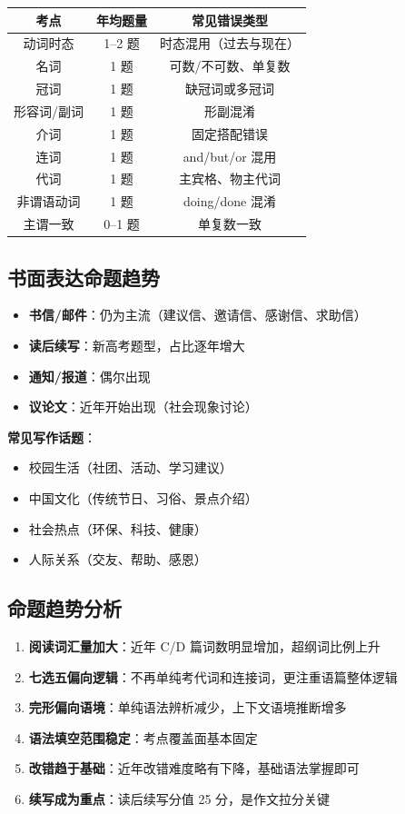 \begin{center}
\begin{tabular}{c|c|c}
\textbf{考点} & \textbf{年均题量} & \textbf{常见错误类型} \\ \toprule
动词时态 & 1--2 题 & 时态混用（过去与现在） \\
名词 & 1 题 & 可数/不可数、单复数 \\
冠词 & 1 题 & 缺冠词或多冠词 \\
形容词/副词 & 1 题 & 形副混淆 \\
介词 & 1 题 & 固定搭配错误 \\
连词 & 1 题 & and/but/or 混用 \\
代词 & 1 题 & 主宾格、物主代词 \\
非谓语动词 & 1 题 & doing/done 混淆 \\
主谓一致 & 0--1 题 & 单复数一致 \\
\bottomrule
\end{tabular}
\end{center}

\subsection{书面表达命题趋势}

\begin{itemize}
  \item \textbf{书信/邮件}：仍为主流（建议信、邀请信、感谢信、求助信）
  \item \textbf{读后续写}：新高考题型，占比逐年增大
  \item \textbf{通知/报道}：偶尔出现
  \item \textbf{议论文}：近年开始出现（社会现象讨论）
\end{itemize}

\textbf{常见写作话题}：
\begin{itemize}
  \item 校园生活（社团、活动、学习建议）
  \item 中国文化（传统节日、习俗、景点介绍）
  \item 社会热点（环保、科技、健康）
  \item 人际关系（交友、帮助、感恩）
\end{itemize}

\subsection{命题趋势分析}

\begin{enumerate}
  \item \textbf{阅读词汇量加大}：近年 C/D 篇词数明显增加，超纲词比例上升
  \item \textbf{七选五偏向逻辑}：不再单纯考代词和连接词，更注重语篇整体逻辑
  \item \textbf{完形偏向语境}：单纯语法辨析减少，上下文语境推断增多
  \item \textbf{语法填空范围稳定}：考点覆盖面基本固定
  \item \textbf{改错趋于基础}：近年改错难度略有下降，基础语法掌握即可
  \item \textbf{续写成为重点}：读后续写分值 25 分，是作文拉分关键
\end{enumerate}

